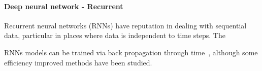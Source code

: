 \paragraph{Deep neural network - Recurrent}
Recurrent neural networks (RNNs) have reputation in dealing with sequential data, particular in places where data is independent to time steps. The 


RNNs models can be trained via back propagation through time~\cite{Goodfellow-et-al-2016}, although some efficiency improved methods have been studied.~\cite{963769,neco.1989,Gomez:2008:ANE:1390681.1390712}